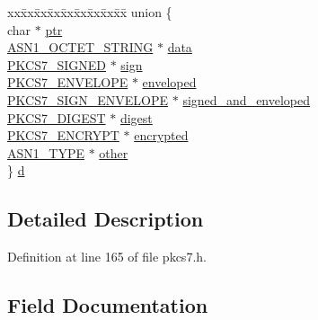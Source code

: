 \begin{DoxyCompactItemize}
\begin{tabbing}
\end{tabbing}\item 
\begin{tabbing}
xx\=xx\=xx\=xx\=xx\=xx\=xx\=xx\=xx\=\kill
union \{\\
\>char $\ast$ \hyperlink{structpkcs7__st_a935adc2e417a61d7eb6f04efb18ba031}{ptr}\\
\>\hyperlink{crypto_2ossl__typ_8h_afbd05e94e0f0430a2b729473efec88c1}{ASN1\_OCTET\_STRING} $\ast$ \hyperlink{structpkcs7__st_ad912ad9a7275eda123accbf6fbdc5daa}{data}\\
\>\hyperlink{crypto_2pkcs7_2pkcs7_8h_ae3e48838b6eec0a566e029e560b8b9d0}{PKCS7\_SIGNED} $\ast$ \hyperlink{structpkcs7__st_a8129d85937f7a208c7940fa6033cfef9}{sign}\\
\>\hyperlink{crypto_2pkcs7_2pkcs7_8h_a1f34be8284ff006103ac91e9c995b817}{PKCS7\_ENVELOPE} $\ast$ \hyperlink{structpkcs7__st_addfc85f45fb2c64da554631a518cb320}{enveloped}\\
\>\hyperlink{crypto_2pkcs7_2pkcs7_8h_a4eb4ff15388b5f4e4d613ceb1c358267}{PKCS7\_SIGN\_ENVELOPE} $\ast$ \hyperlink{structpkcs7__st_a18d91284fe3a47f8f636f5528ac63860}{signed\_and\_enveloped}\\
\>\hyperlink{crypto_2pkcs7_2pkcs7_8h_a73ca53b37fe527bd00bb844b49a54e85}{PKCS7\_DIGEST} $\ast$ \hyperlink{structpkcs7__st_a2ad38484eb9edc690b070d231e2fba03}{digest}\\
\>\hyperlink{crypto_2pkcs7_2pkcs7_8h_a313da3bf0273fe0a578dffa29bc39a22}{PKCS7\_ENCRYPT} $\ast$ \hyperlink{structpkcs7__st_acf84e632e795c7da4eceee41e7e83cb5}{encrypted}\\
\>\hyperlink{crypto_2asn1_2asn1_8h_a7895e03d9fee2bc4963faf2a31a9439e}{ASN1\_TYPE} $\ast$ \hyperlink{structpkcs7__st_a913b5f8be6ebbc8d847d25c9279ee3d2}{other}\\
\} \hyperlink{structpkcs7__st_a9306a9ea59a2f55473b63e1e35cff721}{d}\\

\end{tabbing}\end{DoxyCompactItemize}


\subsection{Detailed Description}


Definition at line 165 of file pkcs7.\+h.



\subsection{Field Documentation}

